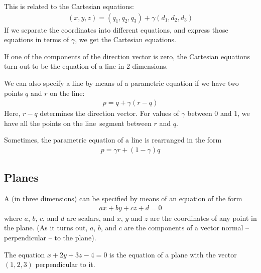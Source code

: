 \documentclass[../COS3712_Notes.tex]{subfiles}
\begin{document}
        This is related to the Cartesian equations:
        \begin{align*}
          (x, y, z) = (q_1, q_2, q_3) + \gamma (d_1, d_2, d_3)
        \end{align*}
        If we separate the coordinates into different equations, and express those equations
        in terms of $\gamma$, we get the Cartesian equations.

        If one of the components of the direction vector is zero, the Cartesian equations
        turn out to be the equation of a line in 2 dimensions.

        We can also specify a line by means of a parametric equation if we have two points
        $q$ and $r$ on the line:
        \begin{align*}
          p = q + \gamma (r - q)
        \end{align*}
        Here, $r - q$ determines the direction vector.
        For values of $\gamma$ between 0 and 1, we have all the points on the line~segment
        between $r$ and $q$.

        Sometimes, the parametric equation of a line is rearranged in the form
        \begin{align*}
          p = \gamma r + (1 - \gamma)q
        \end{align*}

      \subsection{Planes}
        A  (in three dimensions) can be specified by means of an equation
        of the form
        \begin{align*}
          ax + by + cz + d = 0
        \end{align*}
        where $a$, $b$, $c$, and $d$ are scalars, and $x$, $y$ and $z$ are the coordinates
        of any point in the plane.
        (As it turns out, $a$, $b$, and $c$ are the components of a vector normal -- perpendicular -- to the plane).

        The equation $x + 2y + 3z - 4 = 0$ is the equation of a plane with the vector $(1, 2, 3)$
        perpendicular to it.
\end{document}
